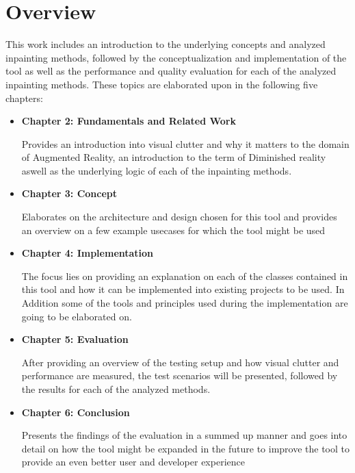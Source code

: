 \section{Overview}

This work includes an introduction to the underlying concepts and analyzed inpainting methods, followed by the conceptualization and implementation of the tool as well as the performance and quality evaluation for each of the analyzed inpainting methods. These topics are elaborated upon in the following five chapters:

\begin{itemize}
\item \textbf{Chapter 2: Fundamentals and Related Work}

Provides an introduction into visual clutter and why it matters to the domain of Augmented Reality, an introduction to the term of Diminished reality aswell as the underlying logic of each of the inpainting methods. 

\item \textbf{Chapter 3: Concept}

Elaborates on the architecture and design chosen for this tool and provides an overview on a few example usecases for which the tool might be used

\item \textbf{Chapter 4: Implementation}

The focus lies on providing an explanation on each of the classes contained in this tool and how it can be implemented into existing projects to be used. In Addition some of the tools and principles used during the implementation are going to be elaborated on.

\item \textbf{Chapter 5: Evaluation}

After providing an overview of the testing setup and how visual clutter and performance are measured, the test scenarios will be presented, followed by the results for each of the analyzed methods.

\item \textbf{Chapter 6: Conclusion}

Presents the findings of the evaluation in a summed up manner and goes into detail on how the tool might be expanded in the future to improve the tool to provide an even better user and developer experience
\end{itemize}